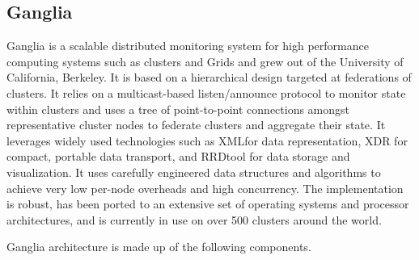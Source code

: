 \subsection{Ganglia}
Ganglia\cite{ganglia} is a scalable distributed monitoring system for high performance
computing systems such as clusters and Grids and grew out of the University of
California, Berkeley. It is based on a hierarchical design targeted at
federations of clusters. It relies on a multicast-based listen/announce protocol
to monitor state within clusters and uses a tree of point-to-point connections
amongst representative cluster nodes to federate clusters and aggregate their
state. It leverages widely used technologies such as XMLfor data representation,
XDR for compact, portable data transport, and RRDtool for data storage and
visualization. It uses carefully engineered data structures and algorithms to
achieve very low per-node overheads and high concurrency. The implementation is
robust, has been ported to an extensive set of operating systems and processor
architectures, and is currently in use on over 500 clusters around the world. 


Ganglia architecture is made up of the following components.

